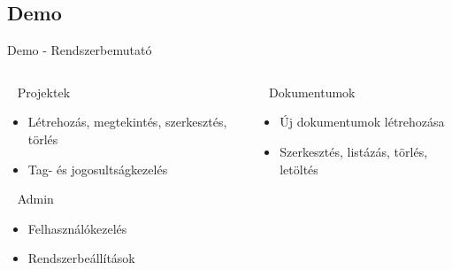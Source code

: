 \documentclass[11pt]{beamer}
\begin{document}
\subsection{Demo}
\begin{frame}{Demo - Rendszerbemutató}
\vspace{-1.5em}
  \begin{columns}[T]
    \begin{column}{0.45\textwidth}
      \begin{block}{\faUsers~ Projektek}
        \begin{itemize}
          \item Létrehozás, megtekintés, szerkesztés, törlés
          \item Tag- és jogosultságkezelés
        \end{itemize}
      \end{block}
      
      \begin{block}{\faUserShield~ Admin}
        \begin{itemize}
          \item Felhasználókezelés
          \item Rendszerbeállítások
        \end{itemize}
      \end{block}
    \end{column}
    
    \begin{column}{0.5\textwidth}
      \begin{block}{\faFileMedical~ Dokumentumok}
        \begin{itemize}
          \item Új dokumentumok létrehozása
          \item Szerkesztés, listázás, törlés, letöltés
        \end{itemize}
      \end{block}
      

\end{column}
\end{columns}
\end{frame}
\end{document}
